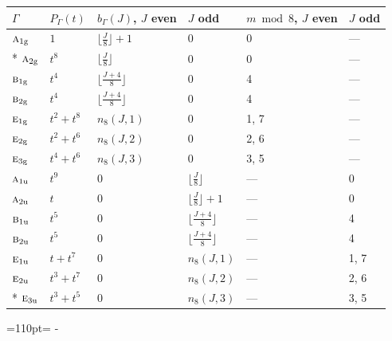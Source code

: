 \documentclass[10pt,a4paper]{article}
\newcommand{\needspace}[1]{\par\penalty-100\begingroup\dimen0=#1\relax\dimen2=\pagegoal
  \advance\dimen2-\pagetotal\ifdim\dimen0>\dimen2\relax\ifdim\dimen2>0pt\vfil\break\fi\fi
  \endgroup}
\numberwithin{equation}{section}
\newcommand{\irr}[1]{\text{\normalfont\scshape #1}}
\newcommand{\ptag}[1]{\mathrm{#1}}
\begin{document}
{\small{\renewcommand{\arraystretch}{1.3}\begin{longtable}{@{}llllll@{}}\toprule
$\Gamma$ & $P_\Gamma(t)$ & $b_\Gamma(J)$, $J$ even & $J$ odd & $m \bmod 8$, $J$ even & $J$ odd\\\midrule\endhead
\bottomrule\endfoot\endlastfoot
$\irr{a}_{1\ptag{g}}$ & $1$ & $\bigl\lfloor\tfrac{J}{8}\bigr\rfloor + 1$ & $0$ & 0 & ---\\*
$\irr{a}_{2\ptag{g}}$ & $t^{8}$ & $\bigl\lfloor\tfrac{J}{8}\bigr\rfloor$ & $0$ & 0 & ---\\
$\irr{b}_{1\ptag{g}}$ & $t^{4}$ & $\bigl\lfloor\tfrac{J+4}{8}\bigr\rfloor$ & $0$ & 4 & ---\\
$\irr{b}_{2\ptag{g}}$ & $t^{4}$ & $\bigl\lfloor\tfrac{J+4}{8}\bigr\rfloor$ & $0$ & 4 & ---\\
$\irr{e}_{1\ptag{g}}$ & $t^{2} + t^{8}$ & $n_{8}(J,1)$ & $0$ & 1, 7 & ---\\
$\irr{e}_{2\ptag{g}}$ & $t^{2} + t^{6}$ & $n_{8}(J,2)$ & $0$ & 2, 6 & ---\\
$\irr{e}_{3\ptag{g}}$ & $t^{4} + t^{6}$ & $n_{8}(J,3)$ & $0$ & 3, 5 & ---\\
$\irr{a}_{1\ptag{u}}$ & $t^{9}$ & $0$ & $\bigl\lfloor\tfrac{J}{8}\bigr\rfloor$ & --- & 0\\
$\irr{a}_{2\ptag{u}}$ & $t$ & $0$ & $\bigl\lfloor\tfrac{J}{8}\bigr\rfloor + 1$ & --- & 0\\
$\irr{b}_{1\ptag{u}}$ & $t^{5}$ & $0$ & $\bigl\lfloor\tfrac{J+4}{8}\bigr\rfloor$ & --- & 4\\
$\irr{b}_{2\ptag{u}}$ & $t^{5}$ & $0$ & $\bigl\lfloor\tfrac{J+4}{8}\bigr\rfloor$ & --- & 4\\
$\irr{e}_{1\ptag{u}}$ & $t + t^{7}$ & $0$ & $n_{8}(J,1)$ & --- & 1, 7\\
$\irr{e}_{2\ptag{u}}$ & $t^{3} + t^{7}$ & $0$ & $n_{8}(J,2)$ & --- & 2, 6\\*
$\irr{e}_{3\ptag{u}}$ & $t^{3} + t^{5}$ & $0$ & $n_{8}(J,3)$ & --- & 3, 5\\
\bottomrule\end{longtable}}}
\needspace{110pt}
\end{document}
